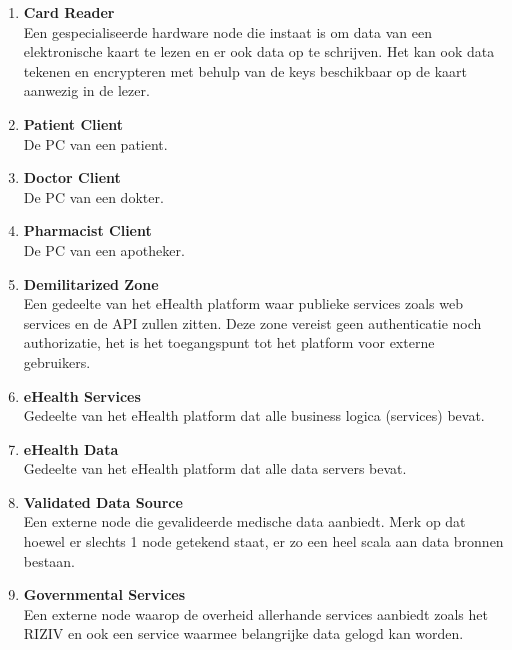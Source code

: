 \documentclass[a4paper,10pt]{book}
\begin{document}
\begin{enumerate}
\item \textbf{Card Reader}\\
Een gespecialiseerde hardware node die instaat is om data van een elektronische kaart
te lezen en er ook data op te schrijven. Het kan ook data tekenen en encrypteren met
behulp van de keys beschikbaar op de kaart aanwezig in de lezer.
\item \textbf{Patient Client}\\
De PC van een patient.
\item \textbf{Doctor Client}\\
De PC van een dokter.
\item \textbf{Pharmacist Client}\\
De PC van een apotheker.
\item \textbf{Demilitarized Zone}\\
Een gedeelte van het eHealth platform waar publieke services zoals web services en
de API zullen zitten. Deze zone vereist geen authenticatie noch authorizatie, het 
is het toegangspunt tot het platform voor externe gebruikers.
\item \textbf{eHealth Services}\\
Gedeelte van het eHealth platform dat alle business logica (services) bevat.
\item \textbf{eHealth Data}\\
Gedeelte van het eHealth platform dat alle data servers bevat.
\item \textbf{Validated Data Source}\\
Een externe node die gevalideerde medische data aanbiedt. Merk op dat hoewel er slechts 1 node
getekend staat, er zo een heel scala aan data bronnen bestaan.
\item \textbf{Governmental Services}\\
Een externe node waarop de overheid allerhande services aanbiedt zoals het RIZIV en ook een
service waarmee belangrijke data gelogd kan worden.
\end{enumerate}
\end{document}

